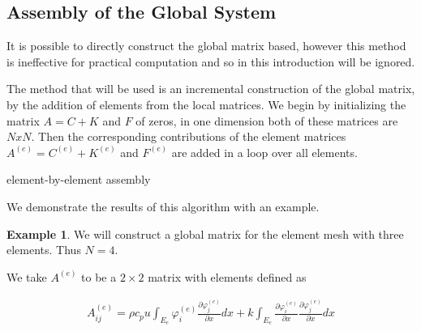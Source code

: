 \documentclass[10pt]{amsart}
\numberwithin{equation}{section}
\theoremstyle{definition}
\newtheorem{example}{Example}[section]
\newcommand{\pder}[2][]{\frac{\partial#1}{\partial#2}}
\begin{document}
\begin{multicols}{2}
\section{Assembly of the Global System}%
\label{sec:assembly_of_the_global_system}

It is possible to directly construct the global matrix based, however this
method is ineffective for practical computation and so in this introduction will
be ignored.

The method that will be used is an incremental construction of the global
matrix, by the addition of elements from the local matrices. We begin by
initializing the matrix $A=C+K$ and $F$ of zeros, in one dimension both of these
matrices are $NxN$. Then the corresponding contributions of the element
matrices $A^{(e)}=C^{(e)}+K^{(e)}$ and $F^{(e)}$ are added in a loop over all
elements.

\begin{algorithm}[H]
  \caption{element-by-element assembly}
  \begin{algorithmic}
    \EndFor
  \end{algorithmic}
\end{algorithm}

We demonstrate the results of this algorithm with an example.

\begin{example}
  We will construct a global matrix for the element mesh with three elements.
  Thus $N=4$.

  We take $A^{(e)}$ to be a $2\times 2$ matrix with elements defined as

  \begin{align*}
    A_{ij}^{(e)}=\rho c_p u \int_{E_e}\varphi_i^{(e)}\pder[\varphi_j^{(e)}]{x}dx+
    k\int_{E_e}\pder[\varphi_i^{(e)}]{x}\pder[\varphi_j^{(e)}]{x}dx
  \end{align*}


\end{example}
\end{multicols}
\end{document}
